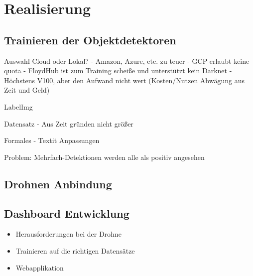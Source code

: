 \chapter{Realisierung}

\section{Trainieren der Objektdetektoren}

Auswahl Cloud oder Lokal?
- Amazon, Azure, etc. zu teuer
- GCP erlaubt keine quota
- FloydHub ist zum Training scheiße und unterstützt kein Darknet
- Höchstens V100, aber den Aufwand nicht wert (Kosten/Nutzen Abwägung aus Zeit und Geld)

LabelImg

Datensatz
- Aus Zeit gründen nicht größer

Formales
- Textit Anpassungen

Problem: Mehrfach-Detektionen werden alle als positiv angesehen

\section{Drohnen Anbindung}

\section{Dashboard Entwicklung}

\begin{itemize}
	\item Herausforderungen bei der Drohne
	\item Trainieren auf die richtigen Datensätze
	\item Webapplikation
\end{itemize}